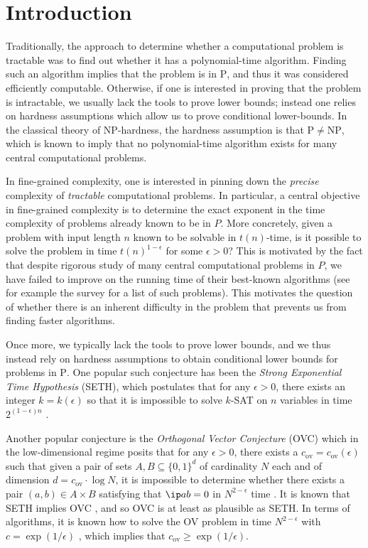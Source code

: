 \documentclass[11pt]{article}
\theoremstyle{plain}
\theoremstyle{remark}
\newcommand{\polytime}{\mathrm{P}}
\newcommand{\NP}{\mathrm{NP}}
\newcommand{\ov}{\mathrm{ov}}
\begin{document}
\section{Introduction}\label{sec:intro}



Traditionally, the approach to determine whether a computational problem is tractable was to find out whether
it has a polynomial-time algorithm. Finding such an algorithm implies that the problem is in $\polytime$,
and thus it was considered efficiently computable. Otherwise, if one is interested
in proving that the problem is intractable, we usually lack
the tools to prove lower bounds; instead one relies on hardness assumptions 
which allow us to prove conditional lower-bounds. 
In the classical theory of $\NP$-hardness, the hardness assumption is that $\polytime \neq \NP$, which is known to imply that no polynomial-time algorithm exists for many central computational problems.


In fine-grained complexity, one is interested in pinning down the  \emph{precise} complexity
of \emph{tractable} computational problems. In particular, a central objective in fine-grained complexity is to 
determine the exact exponent  in the time complexity of
 problems already known to be in $P$. More concretely, given a problem with input length $n$ known
to be solvable in $t(n)$-time, is it possible to solve the problem 
in time $t(n)^{1-\epsilon}$  for some $\epsilon>0$?
 This is  motivated by the fact that despite rigorous study of many central
computational problems in $P$, we have failed to improve on the running time of their best-known algorithms (see for example the survey \cite{Wil18} for a list of such problems). This motivates the question of whether there is an inherent difficulty in the problem that prevents us from finding faster algorithms.

Once more, we typically lack the tools to prove lower bounds, and we  thus instead rely on hardness assumptions to obtain conditional lower bounds for problems in $\polytime$.
One popular such conjecture has been the \emph{Strong Exponential Time Hypothesis} (SETH), which postulates that for any $\epsilon>0$, there exists an integer $k=k(\epsilon)$ so that
it is impossible to solve $k$-SAT on $n$ variables  in time  $2^{(1-\epsilon)n}$ \cite{IP01}.

Another popular conjecture is the \emph{Orthogonal Vector Conjecture} (OVC) which in the low-dimensional regime posits that for any $\epsilon>0$, there exists a $c_{\ov}= c_{\ov}(\epsilon)$ such that given a pair of sets $A,B\subseteq\{0,1\}^{d}$ of cardinality $N$ each and of dimension $d = c_{\ov} \cdot \log N$,  it is impossible to determine whether there exists a pair $(a,b)\in A\times B$
satisfying that $\ip a b=0$ in $N^{2-\epsilon}$ time \cite{GIKW19}. It is known that  SETH implies OVC \cite{Wil05}, and so OVC is at least as plausible as SETH. In terms of algorithms, it is known how to solve the OV problem in time $N^{2-\epsilon}$ with $c = \exp(1/\epsilon)$ \cite{AWY15, CW21}, which implies that $c_{\ov} \geq \exp(1/\epsilon)$.
\end{document}
